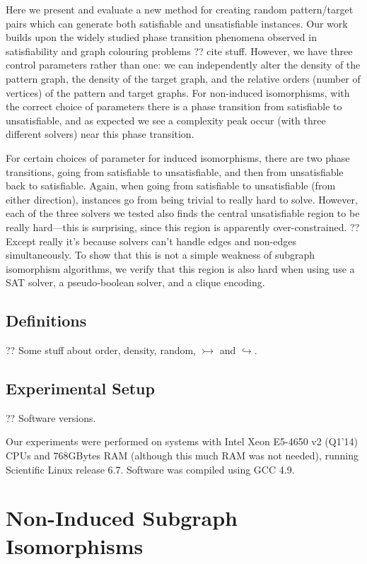 \documentclass[letterpaper]{article}
\begin{document}
Here we present and evaluate a new method for creating random pattern/target pairs which can
generate both satisfiable and unsatisfiable instances. Our work builds upon the widely studied phase
transition phenomena observed in satisfiability and graph colouring problems ?? cite stuff. However,
we have three control parameters rather than one: we can independently alter the density of the
pattern graph, the density of the target graph, and the relative orders (number of vertices) of the
pattern and target graphs.  For non-induced isomorphisms, with the correct choice of parameters
there is a phase transition from satisfiable to unsatisfiable, and as expected we see a complexity
peak occur (with three different solvers) near this phase transition.

For certain choices of parameter for induced isomorphisms, there are two phase transitions, going
from satisfiable to unsatisfiable, and then from unsatisfiable back to satisfiable. Again, when
going from satisfiable to unsatisfiable (from either direction), instances go from being trivial to
really hard to solve. However, each of the three solvers we tested also finds the central
unsatisfiable region to be really hard---this is surprising, since this region is apparently
over-constrained. ?? Except really it's because solvers can't handle edges and non-edges
simultaneously. To show that this is not a simple weakness of subgraph isomorphism algorithms, we
verify that this region is also hard when using use a SAT solver, a pseudo-boolean solver, and a
clique encoding.

\subsection{Definitions}

?? Some stuff about order, density, random, $\rightarrowtail$ and $\hookrightarrow$.

\subsection{Experimental Setup}

?? Software versions.

Our experiments were performed on systems with Intel Xeon E5-4650 v2 (Q1'14) CPUs and 768GBytes RAM
(although this much RAM was not needed), running Scientific Linux release 6.7. Software was compiled
using GCC 4.9.

\section{Non-Induced Subgraph Isomorphisms}
\end{document}
